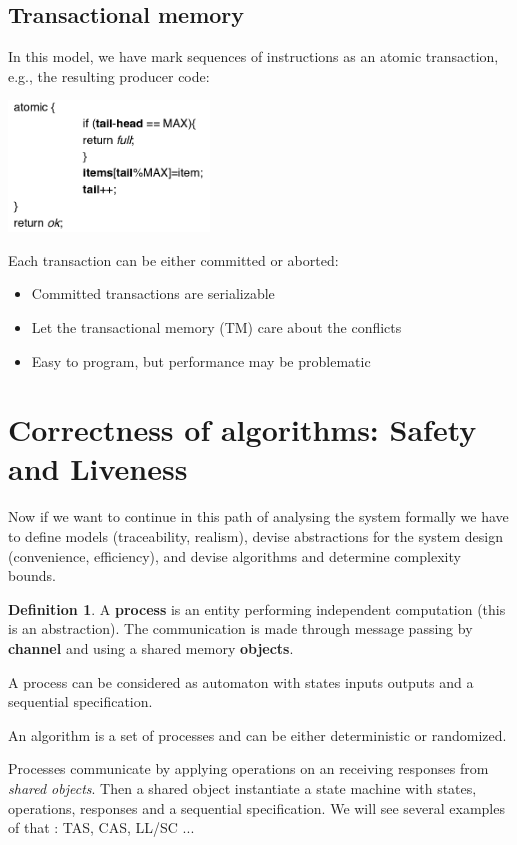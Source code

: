 \documentclass{article}
\theoremstyle{definition}
\newtheorem{definition}{Definition}[section]
\begin{document}
\subsection{Transactional memory}
In this model, we have mark sequences of instructions as an atomic transaction, e.g., the resulting producer code:
\begin{center}
	\includegraphics[width=0.4\textwidth]{prod_transactional}
\end{center}

Each transaction can be either committed or aborted:
\begin{itemize}
	\item Committed transactions are serializable
	\item Let the transactional memory (TM) care about the conflicts
	\item Easy to program, but performance may be problematic
\end{itemize}

\section{Correctness of algorithms: Safety and Liveness}

Now if we want to continue in this path of analysing the system formally we have to define models (traceability, realism), devise abstractions for the system design  (convenience, efficiency), and devise algorithms and determine complexity bounds.

\begin{definition}
A \textbf{process} is an entity performing independent computation (this is an abstraction). The communication is made through message passing by \textbf{channel} and using a  shared memory \textbf{objects}.
\end{definition}

A process can be considered as automaton with states inputs outputs and a sequential specification.

An algorithm is a set of processes and can be either deterministic or randomized.

Processes communicate by applying operations on an receiving responses from \textit{shared objects}. Then a shared object instantiate a state machine with states, operations, responses and a sequential specification. We will see several examples of that : TAS, CAS, LL/SC ...
\end{document}
